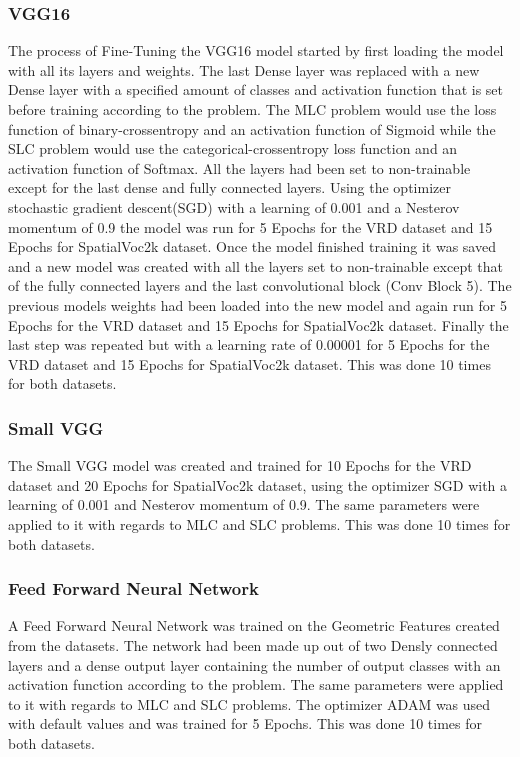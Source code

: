 \documentclass{csfyp}
\begin{document}
\subsubsection{VGG16}
The process of Fine-Tuning the VGG16 model started by first loading the model with all its layers and weights. The last Dense layer was replaced with a new Dense layer with a specified amount of classes and activation function that is set before training according to the problem. The MLC problem would use the loss function of binary-crossentropy  and an activation function of Sigmoid while the SLC problem would use the categorical-crossentropy loss function and an activation function of Softmax. All the layers had been set to non-trainable except for the last dense and fully connected layers. Using the optimizer stochastic gradient descent(SGD) with a learning of 0.001 and a Nesterov momentum of 0.9 the model was run for 5 Epochs for the VRD dataset and 15 Epochs for SpatialVoc2k dataset. Once the model finished training it was saved and a new model was created with all the layers set to non-trainable except that of the fully connected layers and the last convolutional block (Conv Block 5). The previous models weights had been loaded into the new model and again run for 5 Epochs for the VRD dataset and 15 Epochs for SpatialVoc2k dataset. Finally the last step was repeated but with a learning rate of 0.00001 for 5 Epochs for the VRD dataset and 15 Epochs for SpatialVoc2k dataset. This was done 10 times for both datasets.

\subsubsection{Small VGG}
The Small VGG model was created and trained for 10 Epochs for the VRD dataset and 20 Epochs for SpatialVoc2k dataset, using the optimizer SGD with a learning of  0.001 and Nesterov momentum of 0.9. The same parameters were applied to it with regards to MLC and SLC problems. This was done 10 times for both datasets.

\subsubsection{Feed Forward Neural Network}
A Feed Forward Neural Network was trained on the Geometric Features created from the datasets. The network had been made up out of two Densly connected layers and a dense output layer containing the number of output classes with an activation function according to the problem. The same parameters were applied to it with regards to MLC and SLC problems. The optimizer ADAM was used with default values and was trained for 5 Epochs. This was done 10 times for both datasets.
\end{document}
